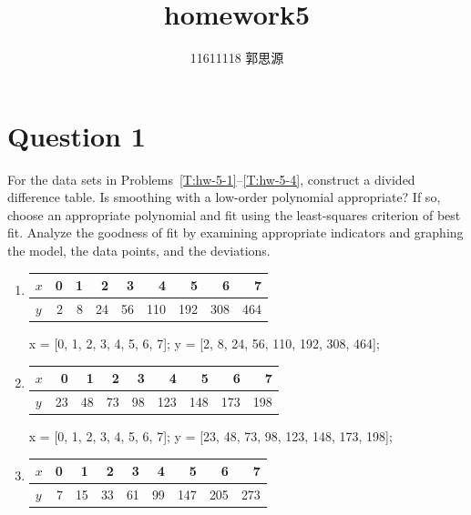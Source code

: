 \documentclass[12pt,a4paper]{article}
\begin{document}
 
\title{homework5}
	\author{11611118 郭思源}  



\section{Question 1}
		\begin{spacing}{1.5}
        For the data sets in Problems~\ref{T:hw-5-1}--\ref{T:hw-5-4}, construct a divided difference table. Is smoothing with a low-order polynomial appropriate? If so, choose an appropriate polynomial and fit using the least-squares criterion of best fit. Analyze the goodness of fit by examining appropriate indicators and graphing the model, the data points, and the deviations.
        \end{spacing}
        \begin{enumerate}
            \item\label{T:hw-5-1}
                \begin{tabular}[t]{l|rrrrrrrr}
                    $x$ & 0 & 1 & 2  & 3  & 4   & 5   & 6   & 7   \\ \hline
                    $y$ & 2 & 8 & 24 & 56 & 110 & 192 & 308 & 464 \\
                \end{tabular}
                \begin{paste}
    x = [0, 1, 2, 3, 4, 5, 6, 7];
    y = [2, 8, 24, 56, 110, 192, 308, 464];
                \end{paste}
            \item\label{T:hw-5-2}
                \begin{tabular}[t]{l|rrrrrrrr}
                    $x$ & 0  & 1  & 2  & 3  & 4   & 5   & 6   & 7   \\ \hline
                    $y$ & 23 & 48 & 73 & 98 & 123 & 148 & 173 & 198 \\
                \end{tabular}
                \begin{paste}
    x = [0, 1, 2, 3, 4, 5, 6, 7];
    y = [23, 48, 73, 98, 123, 148, 173, 198];
                \end{paste}
            \item\label{T:hw-5-3}
                \begin{tabular}[t]{l|rrrrrrrr}
                    $x$ & 0 & 1  & 2  & 3  & 4  & 5   & 6   & 7   \\ \hline
                    $y$ & 7 & 15 & 33 & 61 & 99 & 147 & 205 & 273 \\

\end{tabular}
\end{enumerate}
\end{document}
